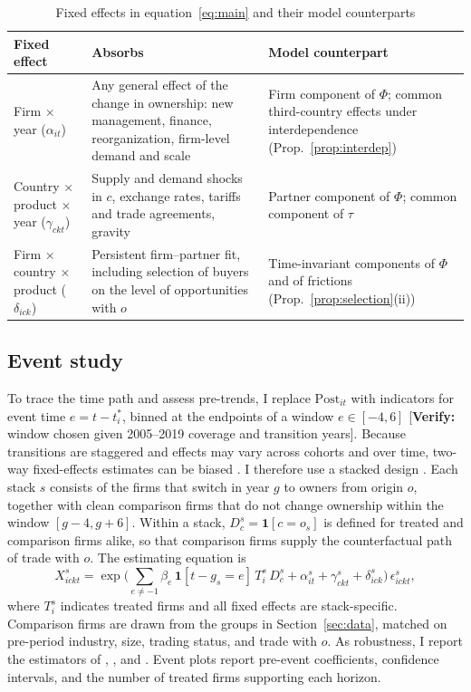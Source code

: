 \documentclass[12pt]{article}
\theoremstyle{remark}
\newcommand{\verify}[1]{\textcolor{BrickRed}{[\textbf{Verify:} #1]}}
\newcommand{\Post}{\mathrm{Post}}
\newcommand{\one}{\mathbf{1}}
\begin{document}
\begin{table}[htbp]\centering\small
\caption{Fixed effects in equation~\eqref{eq:main} and their model counterparts}
\label{tab:fe}
\renewcommand{\arraystretch}{1.2}
\begin{tabularx}{\textwidth}{>{\raggedright\arraybackslash}p{3.6cm}YY}
\toprule
Fixed effect & Absorbs & Model counterpart\\
\midrule
Firm $\times$ year ($\alpha_{it}$) & Any general effect of the change in ownership: new management, finance, reorganization, firm-level demand and scale & Firm component of $\Phi$; common third-country effects under interdependence (Prop.~\ref{prop:interdep})\\
Country $\times$ product $\times$ year ($\gamma_{ckt}$) & Supply and demand shocks in $c$, exchange rates, tariffs and trade agreements, gravity & Partner component of $\Phi$; common component of $\tau$\\
Firm $\times$ country $\times$ product ($\delta_{ick}$) & Persistent firm--partner fit, including selection of buyers on the level of opportunities with $o$ & Time-invariant components of $\Phi$ and of frictions (Prop.~\ref{prop:selection}(ii))\\
\bottomrule
\end{tabularx}
\end{table}

\subsection{Event study}

To trace the time path and assess pre-trends, I replace $\Post_{it}$ with
indicators for event time $e=t-t_i^*$, binned at the endpoints of a window
$e\in[-4,6]$ \verify{window chosen given 2005--2019 coverage and transition
years}. Because transitions are staggered and effects may vary across cohorts
and over time, two-way fixed-effects estimates can be biased
\citep{goodmanbacon2021,dechaisemartin2020}. I therefore use a stacked
design \citep{cengiz2019}. Each stack $s$ consists of the firms that switch in
year $g$ to owners from origin $o$, together with clean comparison firms that
do not change ownership within the window $[g-4,g+6]$. Within a stack,
$D^s_{c}=\one[c=o_s]$ is defined for treated and comparison firms alike, so
that comparison firms supply the counterfactual path of trade with $o$. The
estimating equation is
\begin{equation}
X^s_{ickt} = \exp\Big(\sum_{e\neq-1}\beta_e\,\one[t-g_s=e]\,T^s_i\,D^s_c +
\alpha^s_{it} + \gamma^s_{ckt} + \delta^s_{ick}\Big)\,\epsilon^s_{ickt},
\label{eq:es}
\end{equation}
where $T_i^s$ indicates treated firms and all fixed effects are
stack-specific. Comparison firms are drawn from the groups in
Section~\ref{sec:data}, matched on pre-period industry, size, trading status,
and trade with $o$. As robustness, I report the estimators of
\citet{callaway2021}, \citet{sun2021}, and \citet{borusyak2024}. Event plots
report pre-event coefficients, confidence intervals, and the number of
treated firms supporting each horizon.
\end{document}
